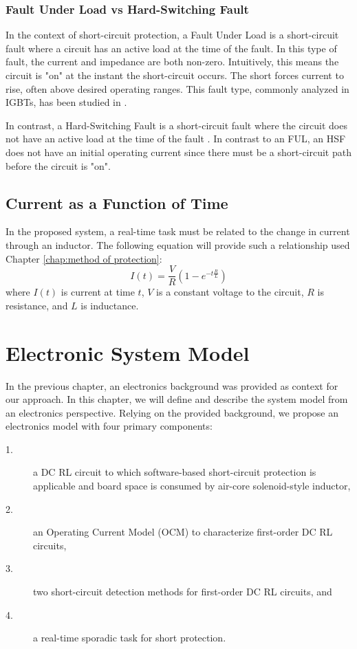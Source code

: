 \documentclass[11pt,oneside]{report}
\begin{document}
    \subsection{Fault Under Load vs Hard-Switching Fault}
    In the context of short-circuit protection, a Fault Under Load is a short-circuit fault where a circuit has an active load at the time of the fault. In this type of fault, the current and impedance are both non-zero. Intuitively, this means the circuit is "on" at the instant the short-circuit occurs. The short forces current to rise, often above desired operating ranges. This fault type, commonly analyzed in IGBTs, has been studied in \cite{scanalysis}.
    
    In contrast, a Hard-Switching Fault is a short-circuit fault where the circuit does not have an active load at the time of the fault \cite{hiSpeedProtection}. In contrast to an FUL, an HSF does not have an initial operating current since there must be a short-circuit path before the circuit is "on".
    
    \section{Current as a Function of Time}
    In the proposed system, a real-time task must be related to the change in current through an inductor. The following equation will provide such a relationship used Chapter \ref{chap:method of protection}:
    \begin{equation}\label{eq:CurrentAtTime}
    I(t) = \frac{V}{R}(1-e^{-t \frac{R}{L}})
    \end{equation}
    where $I(t)$ is current at time $t$, $V$ is a constant voltage to the circuit, $R$ is resistance, and $L$ is inductance.
    \chapter{Electronic System Model}\label{chap:electronic system model}
    In the previous chapter, an electronics background was provided as context for our approach. In this chapter, we will define and describe the system model from an electronics perspective. Relying on the provided background, we propose an electronics model with four primary components:
    \begin{description}
    \item [1.] a DC RL circuit to which software-based short-circuit protection is applicable and board space is consumed by air-core solenoid-style inductor,
    \item [2.] an Operating Current Model (OCM) to characterize first-order DC RL circuits,
    \item [3.] two short-circuit detection methods for first-order DC RL circuits, and
    \item [4.] a real-time sporadic task for short protection.
    \end{description}
    
\end{document}
